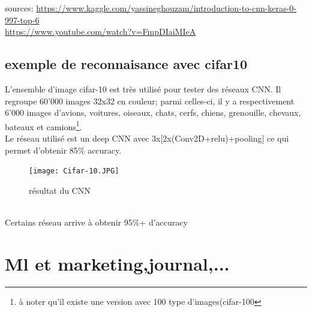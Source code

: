 \documentclass[openany,14pt,fleqn]{book} %
\begin{document}
sources:
\url{https://www.kaggle.com/yassineghouzam/introduction-to-cnn-keras-0-997-top-6}\\
\url{https://www.youtube.com/watch?v=FmpDIaiMIeA}
\section{exemple de reconnaisance avec cifar10}
L'ensemble d'image cifar-10 est très utilisé pour tester des réseaux CNN. Il regroupe 60'000 images 32x32 en couleur; parmi celles-ci, il y a respectivement 6'000 images d'avions, voitures, oiseaux, chats, cerfs, chiens, grenouille, chevaux, bateaux et camions\footnote{à noter qu'il existe une version avec 100 type d'images(cifar-100}.\\
Le réseau utilisé est un deep CNN avec 3x[2x(Conv2D+relu)+pooling] ce qui permet d'obtenir 85\% accuracy.\\
\begin{figure}[h]
\centering\texttt{[image: Cifar-10.JPG]}
\caption{résultat du CNN} 
\end{figure}\\
Certains réseau arrive à obtenir 95\%+ d'accuracy 





\chapter{Ml et marketing,journal,...}
\printbibliography[title=Sources]

%
%


\end{document}
